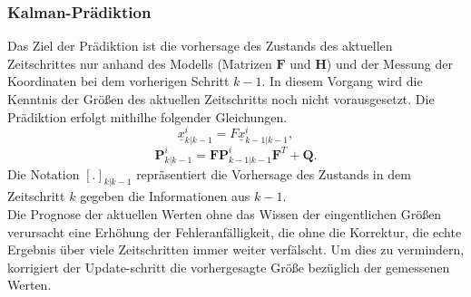 \documentclass[10pt,a4paper]{article}
\begin{document}
\subsubsection{Kalman-Prädiktion}

Das Ziel der Prädiktion ist die vorhersage des Zustands des aktuellen Zeitschrittes nur anhand des Modells (Matrizen $\textbf{F}$ und $\textbf{H}$) und der Messung der Koordinaten bei dem vorherigen Schritt $k-1$. In diesem Vorgang wird die Kenntnis der Größen des aktuellen Zeitschritts noch nicht vorausgesetzt. Die Prädiktion erfolgt mithilhe folgender Gleichungen.
\begin{equation}
\label{eq:GNNPraediktionX}
\underline{x}^i_{k|k-1} = F\underline{x}^i_{k-1|k-1},
\end{equation} 
\begin{equation}
\label{eq:GNNPraediktionP}
\textbf{P}^i_{k|k-1} = \textbf{F}\textbf{P}^i_{k-1|k-1}\textbf{F}^T + \textbf{Q}.
\end{equation} 
Die Notation ${[.]}_{k|k-1}$ repräsentiert die Vorhersage des Zustands in dem Zeitschritt $k$ gegeben die Informationen aus $k-1$.\\
Die Prognose der aktuellen Werten ohne das Wissen der eingentlichen Größen verursacht eine Erhöhung der Fehleranfälligkeit, die ohne die Korrektur, die echte Ergebnis über viele Zeitschritten immer weiter verfälscht. Um dies zu vermindern, korrigiert der Update-schritt die vorhergesagte Größe bezüglich der gemessenen Werten. 
\end{document}
